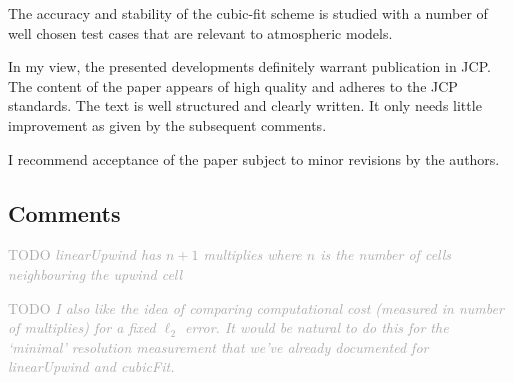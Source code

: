 \documentclass[times]{elsarticle}
\newcommand{\TODO}[1]{\textcolor{darkgray}{TODO \textit{#1}}}
\begin{document}
The accuracy and stability of the cubic-fit scheme is studied with a number of well 
chosen test cases that are relevant to atmospheric models. 

In my view, the presented developments definitely warrant publication in JCP. 
The content of the paper appears of high quality and adheres to the JCP standards. 
The text is well structured and clearly written. It only needs little improvement 
as given by the subsequent comments. 

I recommend acceptance of the paper subject to minor revisions by the authors.

\subsection*{Comments}

\begin{quotation}
\begin{comment}
\item  It is explained in various places that the cubic-fit scheme
    offers favourable computational efficiency due to the fact
    that most of the reconstruction depends on the mesh geometry
    only, and this part can be precomputed. It would be very interesting
    to see numbers in the paper. It doesn't have to be a comprehensive
    study, but just to get an impression of the cost, e.g. how does
    the runtime of the cubic-fit compare to the second-order upwind
    scheme? Or, if one runs cubic-fit and the upwind scheme such that
    both produce about the same $\ell_2$ error (by using a higher resolution
    with the upwind scheme), what is then the difference in runtime?
\end{comment}
\end{quotation}
\TODO{linearUpwind has $n+1$ multiplies where $n$ is the number of cells neighbouring the upwind cell}

\TODO{I also like the idea of comparing computational cost (measured in number of multiplies) for a fixed $\ell_2$ error.  It would be natural to do this for the `minimal' resolution measurement that we've already documented for linearUpwind and cubicFit.}
\end{document}
